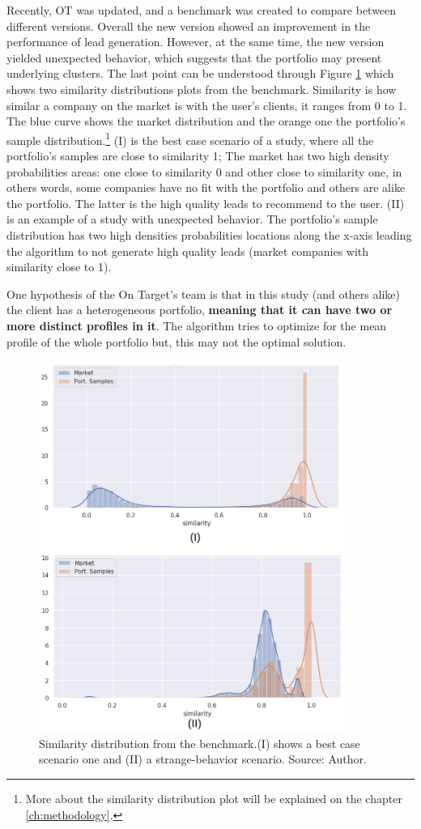 Recently, OT was updated, and a benchmark was created to compare between different versions. Overall the new version showed an improvement in the performance of lead generation. However, at the same time, the new version yielded unexpected behavior, which suggests that the portfolio may present underlying clusters. The last point can be understood through Figure \ref{fig:simi-dist-expected-real} which shows two similarity distributions plots from the benchmark. Similarity is how similar a company on the market is with the user's clients, it ranges from 0 to 1. The blue curve shows the market distribution and the orange one the portfolio's sample distribution.\footnote{More about the similarity distribution plot will be explained on the chapter \ref{ch:methodology}.}
(I) is the best case scenario of a study, where all the portfolio's samples are close to similarity 1; The market has two high density probabilities areas: one close to similarity 0 and other close to similarity one, in others words, some companies have no fit with the portfolio and others are alike the portfolio. The latter is the high quality leads to recommend to the user. (II) is an example of a study with unexpected behavior. The portfolio's sample distribution has two high densities probabilities locations along the x-axis leading the algorithm to not generate high quality leads (market companies with similarity close to 1).

One hypothesis of the On Target's team is that in this study (and others alike) the client has a heterogeneous portfolio, \textbf{meaning that it can have two or more distinct profiles in it}. The algorithm tries to optimize for the mean profile of the whole portfolio but, this may not the optimal solution.

\begin{figure}
   \centering
   \includegraphics[width=10cm]{fig/ch1-simi-dist-expected-real.png} 
   \caption{Similarity distribution from the benchmark.(I) shows a best case scenario one and (II) a strange-behavior scenario. Source: Author.}
   \label{fig:simi-dist-expected-real}
\end{figure}

